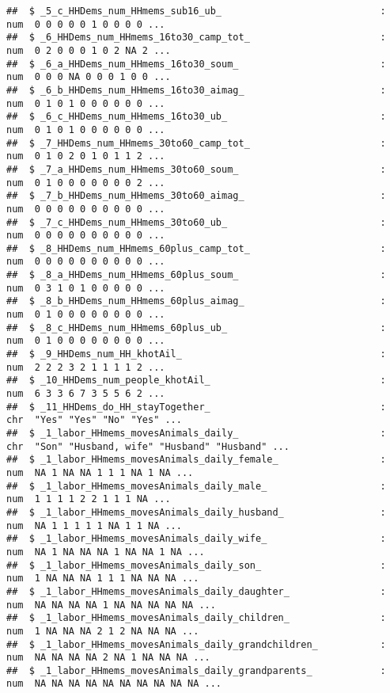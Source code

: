 \documentclass[
]{article}
\begin{document}
\begin{verbatim}
##  $ _5_c_HHDems_num_HHmems_sub16_ub_                            : num  0 0 0 0 0 1 0 0 0 0 ...
##  $ _6_HHDems_num_HHmems_16to30_camp_tot_                       : num  0 2 0 0 0 1 0 2 NA 2 ...
##  $ _6_a_HHDems_num_HHmems_16to30_soum_                         : num  0 0 0 NA 0 0 0 1 0 0 ...
##  $ _6_b_HHDems_num_HHmems_16to30_aimag_                        : num  0 1 0 1 0 0 0 0 0 0 ...
##  $ _6_c_HHDems_num_HHmems_16to30_ub_                           : num  0 1 0 1 0 0 0 0 0 0 ...
##  $ _7_HHDems_num_HHmems_30to60_camp_tot_                       : num  0 1 0 2 0 1 0 1 1 2 ...
##  $ _7_a_HHDems_num_HHmems_30to60_soum_                         : num  0 1 0 0 0 0 0 0 0 2 ...
##  $ _7_b_HHDems_num_HHmems_30to60_aimag_                        : num  0 0 0 0 0 0 0 0 0 0 ...
##  $ _7_c_HHDems_num_HHmems_30to60_ub_                           : num  0 0 0 0 0 0 0 0 0 0 ...
##  $ _8_HHDems_num_HHmems_60plus_camp_tot_                       : num  0 0 0 0 0 0 0 0 0 0 ...
##  $ _8_a_HHDems_num_HHmems_60plus_soum_                         : num  0 3 1 0 1 0 0 0 0 0 ...
##  $ _8_b_HHDems_num_HHmems_60plus_aimag_                        : num  0 1 0 0 0 0 0 0 0 0 ...
##  $ _8_c_HHDems_num_HHmems_60plus_ub_                           : num  0 1 0 0 0 0 0 0 0 0 ...
##  $ _9_HHDems_num_HH_khotAil_                                   : num  2 2 2 3 2 1 1 1 1 2 ...
##  $ _10_HHDems_num_people_khotAil_                              : num  6 3 3 6 7 3 5 5 6 2 ...
##  $ _11_HHDems_do_HH_stayTogether_                              : chr  "Yes" "Yes" "No" "Yes" ...
##  $ _1_labor_HHmems_movesAnimals_daily_                         : chr  "Son" "Husband, wife" "Husband" "Husband" ...
##  $ _1_labor_HHmems_movesAnimals_daily_female_                  : num  NA 1 NA NA 1 1 1 NA 1 NA ...
##  $ _1_labor_HHmems_movesAnimals_daily_male_                    : num  1 1 1 1 2 2 1 1 1 NA ...
##  $ _1_labor_HHmems_movesAnimals_daily_husband_                 : num  NA 1 1 1 1 1 NA 1 1 NA ...
##  $ _1_labor_HHmems_movesAnimals_daily_wife_                    : num  NA 1 NA NA NA 1 NA NA 1 NA ...
##  $ _1_labor_HHmems_movesAnimals_daily_son_                     : num  1 NA NA NA 1 1 1 NA NA NA ...
##  $ _1_labor_HHmems_movesAnimals_daily_daughter_                : num  NA NA NA NA 1 NA NA NA NA NA ...
##  $ _1_labor_HHmems_movesAnimals_daily_children_                : num  1 NA NA NA 2 1 2 NA NA NA ...
##  $ _1_labor_HHmems_movesAnimals_daily_grandchildren_           : num  NA NA NA NA 2 NA 1 NA NA NA ...
##  $ _1_labor_HHmems_movesAnimals_daily_grandparents_            : num  NA NA NA NA NA NA NA NA NA NA ...

\end{verbatim}
\end{document}
